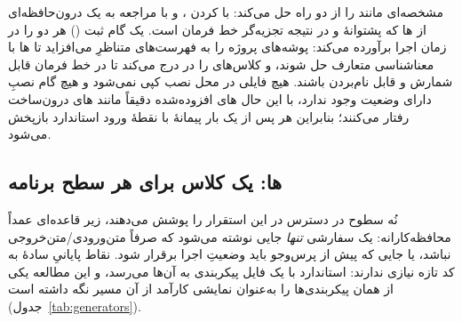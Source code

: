  مشخصه‌ای مانند 
را از دو راه حل می‌کند: با  کردن
، و با مراجعه به یک 
درون‌حافظه‌ای از ها که پشتوانهٔ  و
در نتیجه تجزیه‌گر خط فرمان است. یک گام ثبت
() هر دو را در زمان اجرا برآورده
می‌کند: پوشه‌های  پروژه را به فهرست‌های متناظرِ
 می‌افزاید
تا ها با معناشناسی متعارف  حل شوند، و کلاس‌های
 را در   درج می‌کند تا در خط فرمان قابل
شمارش و قابل نام‌بردن باشند. هیچ فایلی در محل نصب کپی نمی‌شود و هیچ گام
نصبِ دارای وضعیت وجود ندارد، با این حال های افزوده‌شده دقیقاً
مانند های درون‌ساخت رفتار می‌کنند؛ بنابراین هر  پس از
یک بار  پیمانهٔ  با نقطهٔ ورود استاندارد بازپخش
می‌شود.

\subsection{ها: یک کلاس برای هر سطح برنامه}
\label{sec:arch:generators}

نُه  سطوح در دسترس در این استقرار را پوشش می‌دهند، زیر
قاعده‌ای عمداً محافظه‌کارانه: یک  سفارشی \emph{تنها} جایی
نوشته می‌شود که  صرفاً متن‌ورودی/متن‌خروجی نباشد، یا جایی که
پیش از پرس‌وجو باید وضعیتِ اجرا برقرار شود. نقاط پایانیِ سادهٔ 
به کد تازه نیازی ندارند:  استاندارد  با یک
فایل پیکربندی به آن‌ها می‌رسد، و این مطالعه یکی از همان پیکربندی‌ها را
به‌عنوان نمایشی کارآمد از آن مسیر نگه داشته است
(جدول~\ref{tab:generators}).

